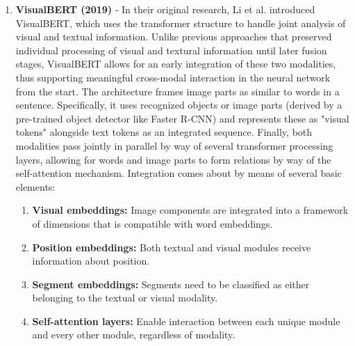 \documentclass[conference]{IEEEtran}
\begin{document}
\begin{enumerate}
\item \textbf{VisualBERT (2019)} - In their original research, Li et al. \cite{li2019visualbert} introduced VisualBERT, which uses the transformer structure to handle joint analysis of visual and textual information. Unlike previous approaches that preserved individual processing of visual and textural information until later fusion stages, VisualBERT allows for an early integration of these two modalities, thus supporting meaningful cross-modal interaction in the neural network from the start.
The architecture frames image parts as similar to words in a sentence. Specifically, it uses recognized objects or image parts (derived by a pre-trained object detector like Faster R-CNN) and represents these as "visual tokens" alongside text tokens as an integrated sequence. Finally, both modalities pass jointly in parallel by way of several transformer processing layers, allowing for words and image parts to form relations by way of the self-attention mechanism.
Integration comes about by means of several basic elements:


\begin{enumerate}
\item \textbf{Visual embeddings:} Image components are integrated into a framework of dimensions that is compatible with word embeddings.
\item \textbf{Position embeddings:} Both textual and visual modules receive information about position.
\item \textbf{Segment embeddings:} Segments need to be classified as either belonging to the textual or visual modality.
\item \textbf{Self-attention layers:} Enable interaction between each unique module and every other module, regardless of modality.
\end{enumerate}



\end{enumerate}
\end{document}
